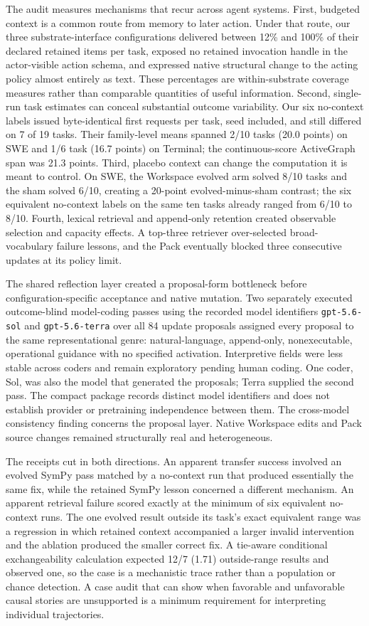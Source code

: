 \documentclass[10pt,twocolumn]{article}
\begin{document}
The audit measures mechanisms that recur across agent systems. First,
budgeted context is a common route from memory to later action. Under
that route, our three substrate-interface configurations delivered
between 12\% and 100\% of their declared retained items per task,
exposed no retained invocation handle in the actor-visible action
schema, and expressed native structural change to the acting policy
almost entirely as text. These percentages are within-substrate coverage
measures rather than comparable quantities of useful information.
Second, single-run task estimates can conceal substantial outcome
variability. Our six no-context labels issued byte-identical first
requests per task, seed included, and still differed on 7 of 19 tasks.
Their family-level means spanned 2/10 tasks (20.0 points) on SWE and 1/6
task (16.7 points) on Terminal; the continuous-score ActiveGraph span
was 21.3 points. Third, placebo context can change the computation it is
meant to control. On SWE, the Workspace evolved arm solved 8/10 tasks
and the sham solved 6/10, creating a 20-point evolved-minus-sham
contrast; the six equivalent no-context labels on the same ten tasks
already ranged from 6/10 to 8/10. Fourth, lexical retrieval and
append-only retention created observable selection and capacity effects.
A top-three retriever over-selected broad-vocabulary failure lessons,
and the Pack eventually blocked three consecutive updates at its policy
limit.

The shared reflection layer created a proposal-form bottleneck before
configuration-specific acceptance and native mutation. Two separately
executed outcome-blind model-coding passes using the recorded model
identifiers \texttt{gpt-5.6-sol} and \texttt{gpt-5.6-terra} over all 84
update proposals assigned every proposal to the same representational
genre: natural-language, append-only, nonexecutable, operational
guidance with no specified activation. Interpretive fields were less
stable across coders and remain exploratory pending human coding. One
coder, Sol, was also the model that generated the proposals; Terra
supplied the second pass. The compact package records distinct model
identifiers and does not establish provider or pretraining independence
between them. The cross-model consistency finding concerns the proposal
layer. Native Workspace edits and Pack source changes remained
structurally real and heterogeneous.

The receipts cut in both directions. An apparent transfer success
involved an evolved SymPy pass matched by a no-context run that produced
essentially the same fix, while the retained SymPy lesson concerned a
different mechanism. An apparent retrieval failure scored exactly at the
minimum of six equivalent no-context runs. The one evolved result
outside its task's exact equivalent range was a regression in which
retained context accompanied a larger invalid intervention and the
ablation produced the smaller correct fix. A tie-aware conditional
exchangeability calculation expected 12/7 (1.71) outside-range results
and observed one, so the case is a mechanistic trace rather than a
population or chance detection. A case audit that can show when
favorable and unfavorable causal stories are unsupported is a minimum
requirement for interpreting individual trajectories.
\end{document}
